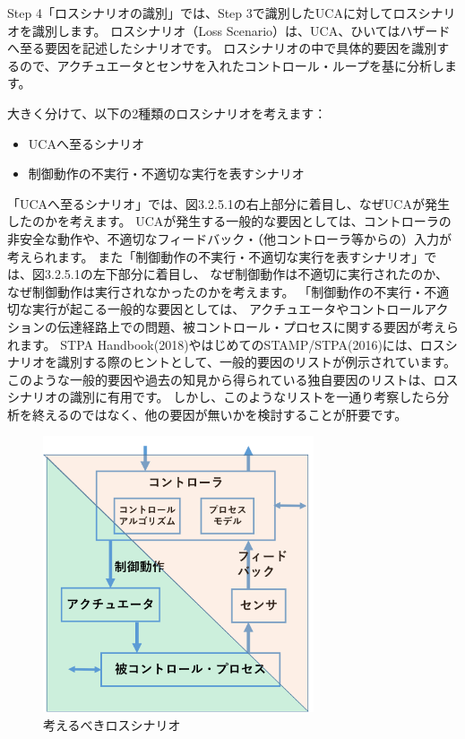 Step 4「ロスシナリオの識別」では、Step 3で識別したUCAに対してロスシナリオを識別します。
ロスシナリオ（Loss Scenario）は、UCA、ひいてはハザードへ至る要因を記述したシナリオです。
ロスシナリオの中で具体的要因を識別するので、アクチュエータとセンサを入れたコントロール・ループを基に分析します。

大きく分けて、以下の2種類のロスシナリオを考えます：
%
\begin{itemize}
    \item UCAへ至るシナリオ
    \item 制御動作の不実行・不適切な実行を表すシナリオ
\end{itemize}
%
「UCAへ至るシナリオ」では、図3.2.5.1の右上部分に着目し、なぜUCAが発生したのかを考えます。
UCAが発生する一般的な要因としては、コントローラの非安全な動作や、不適切なフィードバック・（他コントローラ等からの）入力が考えられます。
また「制御動作の不実行・不適切な実行を表すシナリオ」では、図3.2.5.1の左下部分に着目し、
なぜ制御動作は不適切に実行されたのか、なぜ制御動作は実行されなかったのかを考えます。
「制御動作の不実行・不適切な実行が起こる一般的な要因としては、
アクチュエータやコントロールアクションの伝達経路上での問題、被コントロール・プロセスに関する要因が考えられます。
STPA Handbook(2018)やはじめてのSTAMP/STPA(2016)には、ロスシナリオを識別する際のヒントとして、一般的要因のリストが例示されています。
このような一般的要因や過去の知見から得られている独自要因のリストは、ロスシナリオの識別に有用です。
しかし、このようなリストを一通り考察したら分析を終えるのではなく、他の要因が無いかを検討することが肝要です。
%
\begin{figure}[H]
    \centering
    \includegraphics[width=80mm]{safety_assurance_contents/ch3images/fig-3-2-5-01.png}
    \caption[short]{考えるべきロスシナリオ}
\end{figure}

